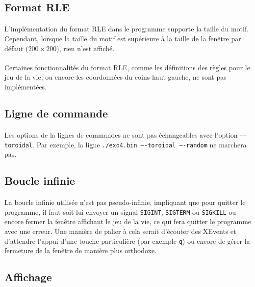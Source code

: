 \documentclass{report}
\begin{document}
\subsection{Format RLE}

\paragraph{} L'implémentation du format RLE dans le programme supporte la
taille du motif. Cependant, lorsque la taille du motif est supérieure à la
taille de la fenêtre par défaut ($200\times200$), rien n'est affiché.

\paragraph{} Certaines fonctionnalités du format RLE, comme les définitions des
règles pour le jeu de la vie, ou encore les coordonnées du coins haut gauche,
ne sont pas implémentées.

\subsection{Ligne de commande}

\paragraph{} Les options de la lignes de commandes ne sont pas échangeables
avec l'option \texttt{----toroidal}. Par exemple, la ligne \texttt{./exo4.bin
----toroidal ----random} ne marchera pas.

\subsection{Boucle infinie}

\paragraph{} La boucle infinie utilisée n'est pas pseudo-infinie, impliquant
que pour quitter le programme, il faut soit lui envoyer un signal
\texttt{SIGINT}, \texttt{SIGTERM} ou \texttt{SIGKILL} ou encore fermer la
fenêtre affichant le jeu de la vie, ce qui fera quitter le programme avec une
erreur. Une manière de palier à cela serait d'écouter des XEvents et d'attendre
l'appui d'une touche particulière (par exemple \texttt{q}) ou encore de gérer
la fermeture de la fenêtre de manière plus orthodoxe.

\subsection{Affichage}
\end{document}
